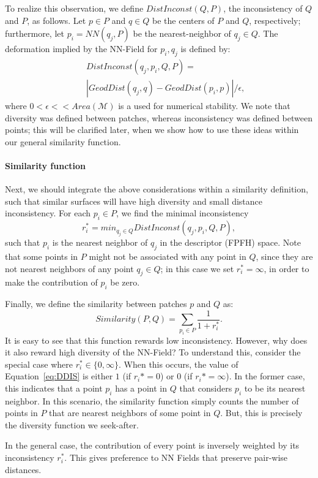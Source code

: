 To realize this observation, we define $DistInconst(Q,P)$, the inconsistency of  $Q$ and $P$, as follows.
Let $p \in P$ and $q \in Q$ be the centers of $P$ and $Q$, respectively;
furthermore, let $p_i= NN(q_j,P)$ be the nearest-neighbor of  $q_j \in Q$.
The deformation implied by the NN-Field for ${p_i,q_j}$ is defined by:
\begin{eqnarray}
	\label{eq:Def}
	&&DistInconst(q_j,p_i,Q,P)= \\
	&&|{GeodDist(q_j,q)-GeodDist(p_i,p)}|/\epsilon, \nonumber
\end{eqnarray}
where $0<\epsilon << Area(\mathcal{M})$ is a used for numerical stability.
We note that diversity was defined between patches, whereas inconsistency was defined between points; this will be clarified later, when we show how to use these ideas within our general similarity function.


\paragraph{Similarity function}
Next, we should integrate the above considerations within a similarity definition, such that similar surfaces will have high diversity and small distance inconsistency.
%
For each $p_i \in P$, we find the minimal inconsistency 
$$r_i^*=min_{q_j \in Q}DistInconst(q_j,p_i,Q,P),$$
such that $p_i$ is the nearest neighbor of $q_j$ in the descriptor (FPFH) space.
Note that some points in $P$ might not be associated with any point in $Q$, since they are not nearest neighbors of any point $q_j\in Q$;
in this case we set $r_i^*=\infty$, in order to make the contribution of $p_i$ be zero.

Finally, we define the similarity between patches $p$ and $Q$ as:
\begin{equation}
	Similarity(P,Q)=\sum_{p_i\in P}\frac{1}{1+r_i^*}.
	\label{eq:DDIS}
\end{equation}
%
It is easy to see that this function rewards low inconsistency.
However, why does it also reward high diversity of the NN-Field?
To understand this, consider the special case where $r_i^*\in\{0,\infty\}$.
When this occurs, the value of Equation~\ref{eq:DDIS} is either $1$ (if $r_i*=0$) or $0$ (if $r_i*=\infty$).  
In the former case, this indicates that a point $p_i$ has a point in $Q$ that considers $p_i$ to be its nearest neighbor.
In this scenario, the similarity function simply counts the number of points in $P$ that are nearest neighbors of some point in $Q$.
But, this is precisely the diversity function we seek-after.

In the general case, the contribution of every point is inversely weighted by its inconsistency $r_i^*$.
This gives preference to NN Fields that preserve pair-wise distances.
